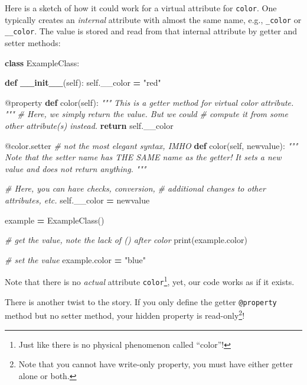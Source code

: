 \documentclass[
]{book}
\newenvironment{Shaded}{\begin{snugshade}}{\end{snugshade}}
\newcommand{\AttributeTok}[1]{\textcolor[rgb]{0.13,0.29,0.53}{#1}}
\newcommand{\BuiltInTok}[1]{#1}
\newcommand{\CommentTok}[1]{\textcolor[rgb]{0.56,0.35,0.01}{\textit{#1}}}
\newcommand{\ControlFlowTok}[1]{\textcolor[rgb]{0.13,0.29,0.53}{\textbf{#1}}}
\newcommand{\FunctionTok}[1]{\textcolor[rgb]{0.13,0.29,0.53}{\textbf{#1}}}
\newcommand{\KeywordTok}[1]{\textcolor[rgb]{0.13,0.29,0.53}{\textbf{#1}}}
\newcommand{\NormalTok}[1]{#1}
\newcommand{\OperatorTok}[1]{\textcolor[rgb]{0.81,0.36,0.00}{\textbf{#1}}}
\newcommand{\StringTok}[1]{\textcolor[rgb]{0.31,0.60,0.02}{#1}}
\newcommand{\VariableTok}[1]{\textcolor[rgb]{0.00,0.00,0.00}{#1}}
\begin{document}
Here is a sketch of how it could work for a virtual attribute for \texttt{color}. One typically creates an \emph{internal} attribute with almost the same name, e.g., \texttt{\_color} or \texttt{\_\_color}. The value is stored and read from that internal attribute by getter and setter methods:

\begin{Shaded}
\begin{Highlighting}[]
\KeywordTok{class}\NormalTok{ ExampleClass:}

  \KeywordTok{def} \FunctionTok{\_\_init\_\_}\NormalTok{(}\VariableTok{self}\NormalTok{):}
    \VariableTok{self}\NormalTok{.\_\_color }\OperatorTok{=} \StringTok{"red"}

  \AttributeTok{@property}
  \KeywordTok{def}\NormalTok{ color(}\VariableTok{self}\NormalTok{):}
    \CommentTok{"""}
\CommentTok{    This is a getter method for virtual color}
\CommentTok{    attribute.}
\CommentTok{    """}
    \CommentTok{\# Here, we simply return the value. But we could }
    \CommentTok{\# compute it from some other attribute(s) instead.}
    \ControlFlowTok{return} \VariableTok{self}\NormalTok{.\_\_color}
    
  \AttributeTok{@color.setter} \CommentTok{\# not the most elegant syntax, IMHO}
  \KeywordTok{def}\NormalTok{ color(}\VariableTok{self}\NormalTok{, newvalue):}
    \CommentTok{"""}
\CommentTok{    Note that the setter name has THE SAME name as the getter!}
\CommentTok{    It sets a new value and does not return anything.}
\CommentTok{    """}
  
    \CommentTok{\# Here, you can have checks, conversion, }
    \CommentTok{\# additional changes to other attributes, etc.}
    \VariableTok{self}\NormalTok{.\_\_color }\OperatorTok{=}\NormalTok{ newvalue}
    
    
\NormalTok{example }\OperatorTok{=}\NormalTok{ ExampleClass()}

\CommentTok{\# get the value, note the lack of () after color}
\BuiltInTok{print}\NormalTok{(example.color)}

\CommentTok{\# set the value}
\NormalTok{example.color }\OperatorTok{=} \StringTok{"blue"}
\end{Highlighting}
\end{Shaded}

Note that there is no \emph{actual} attribute \texttt{color}\footnote{Just like there is no physical phenomenon called ``color''!}, yet, our code works as if it exists.

There is another twist to the story. If you only define the getter \texttt{@property} method but no setter method, your hidden property is read-only\footnote{Note that you cannot have write-only property, you must have either getter alone or both.}!
\end{document}
